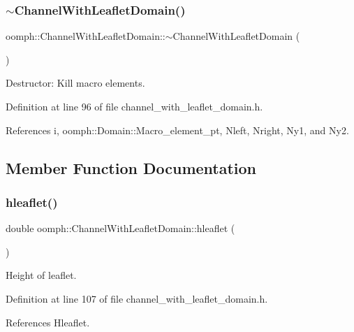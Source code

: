 \subsubsection{\texorpdfstring{$\sim$\+Channel\+With\+Leaflet\+Domain()}{~ChannelWithLeafletDomain()}}
{\footnotesize\ttfamily oomph\+::\+Channel\+With\+Leaflet\+Domain\+::$\sim$\+Channel\+With\+Leaflet\+Domain (\begin{DoxyParamCaption}{ }\end{DoxyParamCaption})\hspace{0.3cm}{\ttfamily [inline]}}



Destructor\+: Kill macro elements. 



Definition at line 96 of file channel\+\_\+with\+\_\+leaflet\+\_\+domain.\+h.



References i, oomph\+::\+Domain\+::\+Macro\+\_\+element\+\_\+pt, Nleft, Nright, Ny1, and Ny2.



\subsection{Member Function Documentation}
\mbox{\label{classoomph_1_1ChannelWithLeafletDomain_af70ada72d505ebea468d1000b04c20e1}} 
\subsubsection{\texorpdfstring{hleaflet()}{hleaflet()}}
{\footnotesize\ttfamily double oomph\+::\+Channel\+With\+Leaflet\+Domain\+::hleaflet (\begin{DoxyParamCaption}{ }\end{DoxyParamCaption})\hspace{0.3cm}{\ttfamily [inline]}}



Height of leaflet. 



Definition at line 107 of file channel\+\_\+with\+\_\+leaflet\+\_\+domain.\+h.



References Hleaflet.



